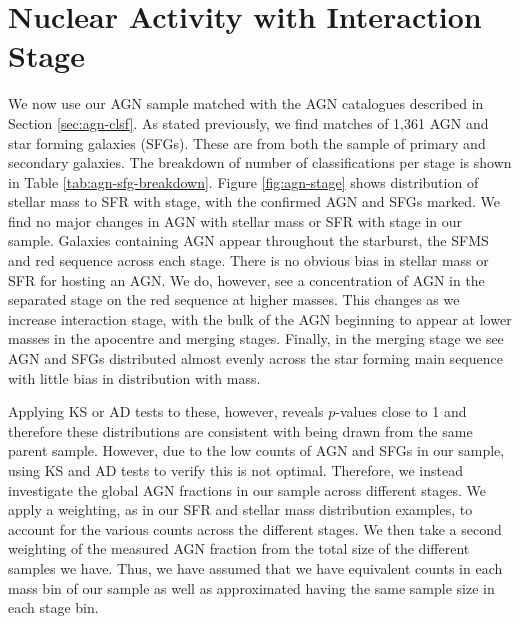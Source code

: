\section{Nuclear Activity with Interaction Stage}\label{results:AGN_stage}
\noindent We now use our AGN sample matched with the AGN catalogues described in Section \ref{sec:agn-clsf}. As stated previously, we find matches of 1,361 AGN and star forming galaxies (SFGs). These are from both the sample of primary and secondary galaxies. The breakdown of number of classifications per stage is shown in Table \ref{tab:agn-sfg-breakdown}. Figure \ref{fig:agn-stage} shows distribution of stellar mass to SFR with stage, with the confirmed AGN and SFGs marked. We find no major changes in AGN with stellar mass or SFR with stage in our sample. Galaxies containing AGN appear throughout the starburst, the SFMS and red sequence across each stage. There is no obvious bias in stellar mass or SFR for hosting an AGN. We do, however, see a concentration of AGN in the separated stage on the red sequence at higher masses. This changes as we increase interaction stage, with the bulk of the AGN beginning to appear at lower masses in the apocentre and merging stages. Finally, in the merging stage we see AGN and SFGs distributed almost evenly across the star forming main sequence with little bias in distribution with mass.

Applying KS or AD tests to these, however, reveals $p$-values close to 1 and therefore these distributions are consistent with being drawn from the same parent sample. However, due to the low counts of AGN and SFGs in our sample, using KS and AD tests to verify this is not optimal. Therefore, we instead investigate the global AGN fractions in our sample across different stages. We apply a weighting, as in our SFR and stellar mass distribution examples, to account for the various counts across the different stages. We then take a second weighting of the measured AGN fraction from the total size of the different samples we have. Thus, we have assumed that we have equivalent counts in each mass bin of our sample as well as approximated having the same sample size in each stage bin.

